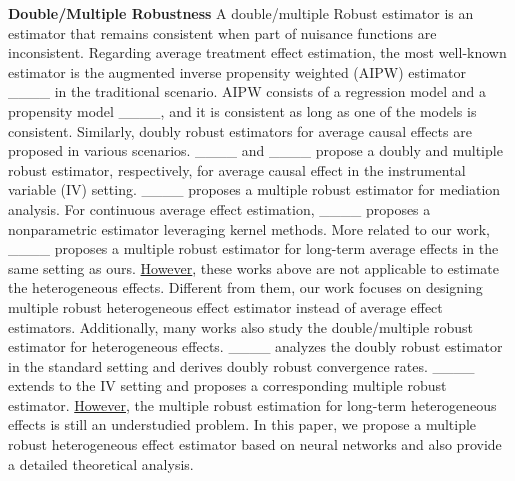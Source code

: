 \textbf{Double/Multiple Robustness}
A double/multiple Robust estimator is an estimator that remains consistent when part of nuisance functions are inconsistent.
Regarding average treatment effect estimation, the most well-known estimator is the augmented inverse propensity weighted (AIPW) estimator ____ in the traditional scenario. 
AIPW consists of a regression model and a propensity model ____, and it is consistent as long as one of the models is consistent.
Similarly, doubly robust estimators for average causal effects are proposed in various scenarios.
____ and ____ propose a doubly and multiple robust estimator, respectively, for average causal effect in the instrumental variable (IV) setting.
____ proposes a multiple robust estimator for mediation analysis.
For continuous average effect estimation, ____ proposes a nonparametric estimator leveraging kernel methods.
More related to our work, ____ proposes a multiple robust estimator for long-term average effects in the same setting as ours. 
\underline{However}, these works above are not applicable to estimate the heterogeneous effects.
Different from them, our work focuses on designing multiple robust heterogeneous effect estimator instead of average effect estimators.
Additionally, many works also study the double/multiple robust estimator for heterogeneous effects.
____ analyzes the doubly robust estimator in the standard setting and derives doubly robust convergence rates.
____ extends to the IV setting and proposes a corresponding multiple robust estimator.
\underline{However}, the multiple robust estimation for long-term heterogeneous effects is still an understudied problem. 
In this paper, we propose a multiple robust heterogeneous effect estimator based on neural networks and also provide a detailed theoretical analysis.